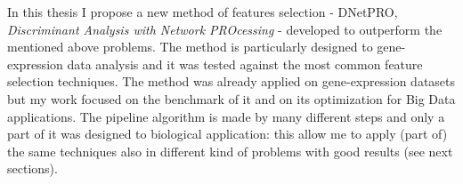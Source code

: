 \documentclass{standalone}
\begin{document}
In this thesis I propose a new method of features selection - DNetPRO, \emph{Discriminant Analysis with Network PROcessing} - developed to outperform the mentioned above problems.
The method is particularly designed to gene-expression data analysis and it was tested against the most common feature selection techniques.
The method was already applied on gene-expression datasets but my work focused on the benchmark of it and on its optimization for Big Data applications.
The pipeline algorithm is made by many different steps and only a part of it was designed to biological application: this allow me to apply (part of) the same techniques also in different kind of problems with good results (see next sections).
\end{document}
